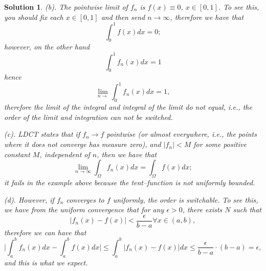 \documentclass[6pt]{article}
\newtheorem{solution}{Solution}
\numberwithin{equation}{section}
\begin{document}
\begin{enumerate}
\begin{solution}
(b).  The pointwise limit of $f_n$ is $f(x)\equiv 0$, $x\in[0,1]$.  To see this, you should fix each $x\in[0,1]$ and then send $n\rightarrow \infty$, therefore we have that
\[\int_0^1f(x)dx=0;\]
however, on the other hand
\[\int_0^1 f_n(x)dx=1\]
hence
\[\lim_{n\rightarrow}\int_0^1 f_n(x)dx=1,\]
therefore the limit of the integral and integral of the limit do not equal, i.e., the order of the limit and integration can not be switched.

(c).  LDCT states that if $f_n\rightarrow f $ pointwise (or almost everywhere, i.e., the points where it does not converge has \emph{measure} zero), and $|f_n|<M$ for some positive constant $M$, independent of $n$, then we have that
\[\lim_{n\rightarrow \infty}\int_\Omega f_n(x)dx=\int_\Omega f(x)dx;\]
it fails in the example above because the tent--function is not uniformly bounded.

(d).  However, if $f_n$ converges to $f$ uniformly, the order is switchable.  To see this, we have from the uniform convergence that for any $\epsilon>0$, there exists $N$ such that
\[|f_n(x)-f(x)|<\frac{\epsilon}{b-a} \forall  x\in(a,b),\]
therefore we can have that
\[\Big| \int_a^b f_n(x)dx-\int_a^bf(x)dx \Big|\leq \int_a^b |f_n(x)-f(x)|dx\leq \frac{\epsilon}{b-a}\cdot (b-a)=\epsilon,\]
and this is what we expect.
\end{solution}




\end{enumerate}
\end{document}
